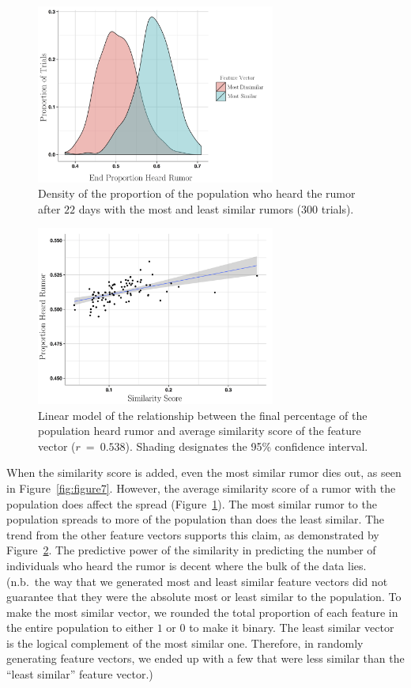 \begin{figure}[H]
\captionsetup{width=0.8\textwidth}
\centering
    \includegraphics[width=0.7\textwidth]{figures/figure8}
  \caption{ Density of the proportion of the population who heard the rumor after $ 22 $ days with the most and least similar rumors ($ 300 $ trials).}
\label{fig:figure8}
\end{figure}

\begin{figure}[H]
\captionsetup{width=0.8\textwidth}
\centering
    \includegraphics[width=0.7\textwidth]{figures/figure9}
  \caption{ Linear model of the relationship between the final percentage of the population heard rumor and average similarity score of the feature vector ($ r~=~0.538 $).
Shading designates the 95\% confidence interval.}
\label{fig:figure9}
\end{figure}

When the similarity score is added, even the most similar rumor dies out, as seen in Figure~\ref{fig:figure7}.
However, the average similarity score of a rumor with the population does affect the spread (Figure~\ref{fig:figure8}).
The most similar rumor to the population spreads to more of the population than does the least similar.
The trend from the other feature vectors supports this claim, as demonstrated by Figure~\ref{fig:figure9}.
The predictive power of the similarity in predicting the number of individuals who heard the rumor is decent where the bulk of the data lies.
(n.b.\ the way that we generated most and least similar feature vectors did not guarantee that they were the absolute most or least similar to the population.
To make the most similar vector, we rounded the total proportion of each feature in the entire population to either $ 1 $ or $ 0 $ to make it binary.
The least similar vector is the logical complement of the most similar one.
Therefore, in randomly generating feature vectors, we ended up with a few that were less similar than the ``least similar'' feature vector.)
